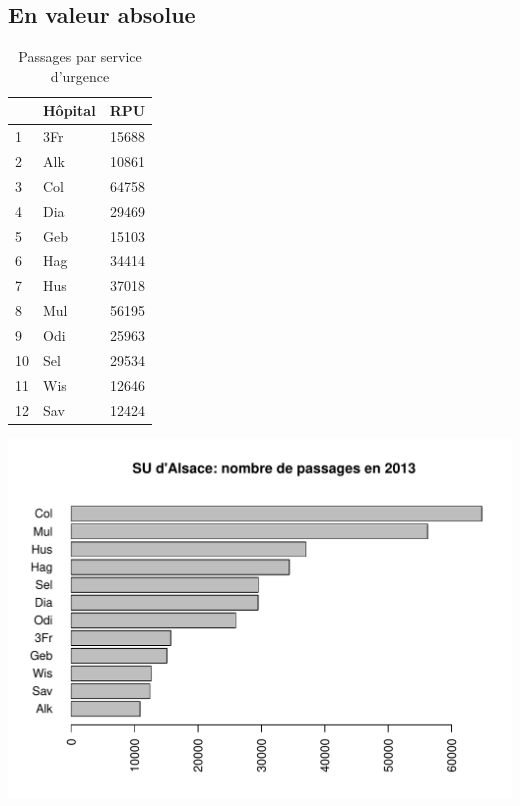 \documentclass[12pt,english,french,twoside]{book}\usepackage[]{graphicx}\usepackage[]{color}
\makeatletter
\def\maxwidth{ %
  \ifdim\Gin@nat@width>\linewidth
    \linewidth
  \else
    \Gin@nat@width
  \fi
}
\newenvironment{knitrout}{}{} %
\makeatother
\begin{document}
\subsection*{En valeur absolue}

\begin{table}[ht]
\centering
\begin{tabular}{llr}
  \hline
 & Hôpital & RPU \\ 
  \hline
1 & 3Fr & 15688 \\ 
  2 & Alk & 10861 \\ 
  3 & Col & 64758 \\ 
  4 & Dia & 29469 \\ 
  5 & Geb & 15103 \\ 
  6 & Hag & 34414 \\ 
  7 & Hus & 37018 \\ 
  8 & Mul & 56195 \\ 
  9 & Odi & 25963 \\ 
  10 & Sel & 29534 \\ 
  11 & Wis & 12646 \\ 
  12 & Sav & 12424 \\ 
   \hline
\end{tabular}
\caption[Nombre de passages par service d'urgence]{Passages par service d'urgence} 
\label{fig:passage_su}
\end{table}



\begin{center}
\begin{knitrout}
\color{fgcolor}
\includegraphics[width=\maxwidth]{figure/bplot_val_abs} 

\end{knitrout}

\label{fig:bplot_val_abs}
\end{center}
\end{document}
